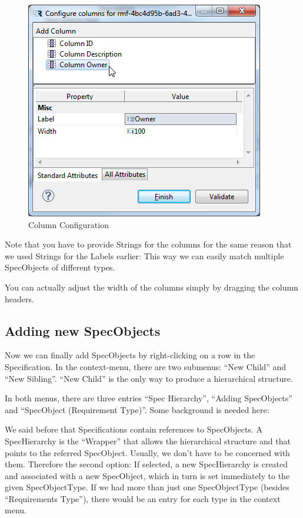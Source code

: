 \begin{figure}[h!]
\centering      
\includegraphics[width=0.8\linewidth]{../rmf-images/pror_column_configuration.png}      
\caption{Column Configuration}
\label{fig:column_configuration}
\end{figure}

Note that you have to provide Strings for the columns for the same
reason that we used Strings for the Labels earlier: This way we can
easily match multiple SpecObjects of different types.

You can actually adjust the width of the columns simply by dragging the
column headers.

\subsection{Adding new SpecObjects}

Now we can finally add SpecObjects by right-clicking on a row in the
Specification. In the context-menu, there are two submenus: ``New
Child'' and ``New Sibling''. ``New Child'' is the only way to produce a
hierarchical structure.

In both menus, there are three entries ``Spec Hierarchy'', ``Adding
SpecObjects'' and ``SpecObject (Requirement Type)''. Some background is
needed here:

We said before that Specifications contain references to SpecObjects. A
SpecHierarchy is the ``Wrapper'' that allows the hierarchical structure
and that points to the referred SpecObject. Usually, we don't have to be
concerned with them. Therefore the second option: If selected, a new
SpecHierarchy is created and associated with a new SpecObject, which in
turn is set immediately to the given SpecObjectType. If we had more than
just one SpecObjectType (besides ``Requirements Type''), there would be
an entry for each type in the context menu.

